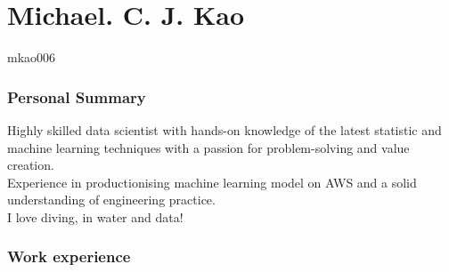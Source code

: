 \documentclass{tccv}
\begin{document}
\part{Michael. C. J. Kao}



\vspace{0.5cm}
    {mkao006}

\section{Personal Summary}

Highly skilled data scientist with hands-on knowledge of the latest
statistic and machine learning techniques with a passion for
problem-solving and value creation.\\

Experience in productionising machine learning model on AWS and a
solid understanding of engineering practice.\\

I love diving, in water and data!



\section{Work experience}
\end{document}
